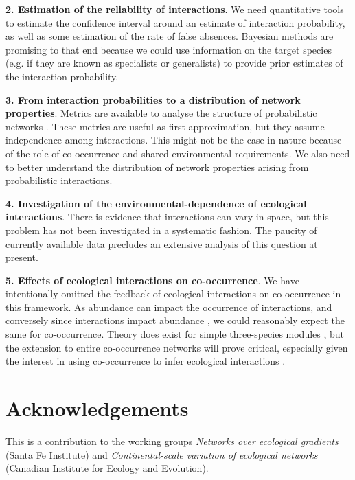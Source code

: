 \documentclass[12pt]{article}
\begin{document}
\textbf{2. Estimation of the reliability of interactions}. We need quantitative tools
to estimate the confidence interval around an estimate of interaction
probability, as well as some estimation of the rate of false absences.
Bayesian methods are promising to that end because we could use information on
the target species (e.g. if they are known as specialists or generalists) to
provide prior estimates of the interaction probability.

\textbf{3. From interaction probabilities to a distribution of network properties}.
Metrics are available to analyse the structure of probabilistic networks
\citep{Poisot2015c}. These metrics are useful as first approximation, but they
assume independence among interactions. This might not be the case in nature
because of the role of co-occurrence and shared environmental requirements. We
also need to better understand the distribution of network properties arising
from probabilistic interactions.

\textbf{4. Investigation of the environmental-dependence of ecological interactions}.
There is evidence that interactions can vary in space, but this problem has
not been investigated in a systematic fashion. The paucity of currently available data
precludes an extensive analysis of this question at present.

\textbf{5. Effects of ecological interactions on co-occurrence}. We have
intentionally omitted the feedback of ecological interactions on co-occurrence
in this framework. As abundance can impact the occurrence of interactions, and
conversely since interactions impact abundance \citep{Canard2014}, we could
reasonably expect the same for co-occurrence. Theory does exist for simple
three-species modules \citep{Cazelles2015}, but the extension to entire co-occurrence
networks will prove critical, especially given the interest in
using co-occurrence to infer ecological interactions \citep{Morales2015,
Morueta-Holme2016}.

\section*{Acknowledgements}
This is a contribution to the working groups \emph{Networks over ecological
gradients} (Santa Fe Institute) and \emph{Continental-scale variation of
ecological networks} (Canadian Institute for Ecology and Evolution). 
\newpage


\end{document}
